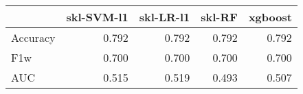 \begin{tabular}{lrrrr}
\toprule
{} &  skl-SVM-l1 &  skl-LR-l1 &  skl-RF &  xgboost \\
\midrule
Accuracy &       0.792 &      0.792 &   0.792 &    0.792 \\
F1w      &       0.700 &      0.700 &   0.700 &    0.700 \\
AUC      &       0.515 &      0.519 &   0.493 &    0.507 \\
\bottomrule
\end{tabular}
